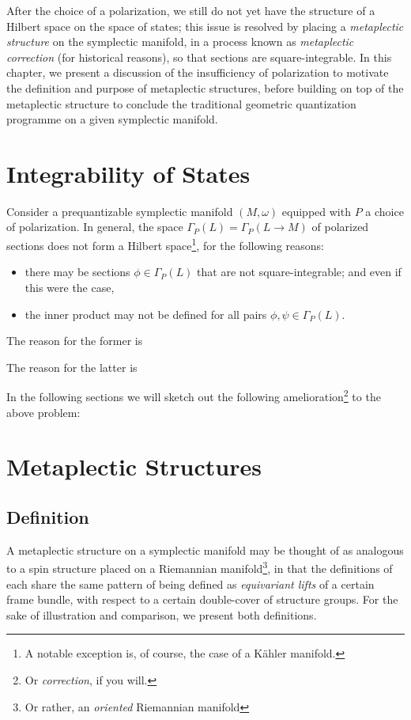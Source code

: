 After the choice of a polarization, we still do not yet have the structure of a Hilbert space on the space of states; this issue is resolved by placing a \emph{metaplectic structure} on the symplectic manifold, in a process known as \emph{metaplectic correction} (for historical reasons), so that sections are square-integrable. In this chapter, we present a discussion of the insufficiency of polarization to motivate the definition and purpose of metaplectic structures, before building on top of the metaplectic structure to conclude the traditional geometric quantization programme on a given symplectic manifold.

\section{Integrability of States}
Consider a prequantizable symplectic manifold $(M,\omega)$ equipped with $P$ a choice of polarization. In general, the space $\Gamma_P(L) = \Gamma_P(L \to M)$ of polarized sections does not form a Hilbert space\footnote{A notable exception is, of course, the case of a K\"{a}hler manifold.}, for the following reasons:
\begin{itemize}
\item there may be sections $\phi \in \Gamma_P(L)$ that are not square-integrable; and even if this were the case,

\item the inner product may not be defined for all pairs $\phi,\psi \in \Gamma_P(L)$.

\end{itemize}

The reason for the former is %


The reason for the latter is %


In the following sections we will sketch out the following amelioration\footnote{Or \emph{correction}, if you will.} to the above problem: %


\section{Metaplectic Structures}
\subsection{Definition}
A metaplectic structure on a symplectic manifold may be thought of as analogous to a spin structure placed on a Riemannian manifold\footnote{Or rather, an \emph{oriented} Riemannian manifold}, in that the definitions of each share the same pattern of being defined as \emph{equivariant lifts} of a certain frame bundle, with respect to a certain double-cover of structure groups. For the sake of illustration and comparison, we present both definitions.

